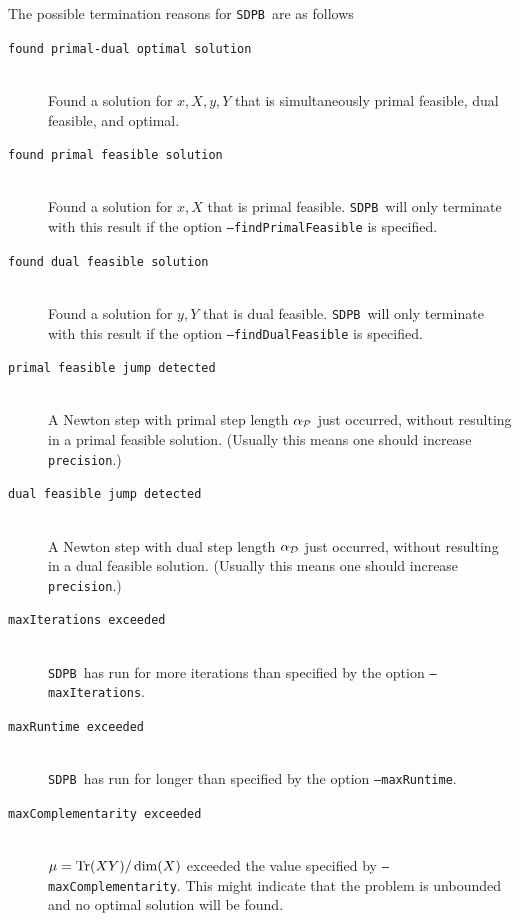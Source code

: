 \documentclass[12pt]{article}
\numberwithin{equation}{section}
\newcommand\SDPB{\texttt{SDPB}}
\begin{document}
The possible termination reasons for \SDPB\ are as follows
\begin{description}
\item[\texttt{found primal-dual optimal solution}] \hfill\\
Found a solution for $x,X,y,Y$ that is simultaneously primal feasible, dual feasible, and optimal.
\item[\texttt{found primal feasible solution}] \hfill\\
Found a solution for $x,X$ that is primal feasible.  \SDPB\ will only terminate with this result if the option \texttt{--findPrimalFeasible} is specified.
\item[\texttt{found dual feasible solution}] \hfill\\
Found a solution for $y,Y$ that is dual feasible.  \SDPB\ will only terminate with this result if the option \texttt{--findDualFeasible} is specified.
\item[\texttt{primal feasible jump detected}] \hfill\\
A Newton step with primal step length $\alpha_{\mathcal{P}}$ just occurred, without resulting in a primal feasible solution.  (Usually this means one should increase \texttt{precision}.)
\item[\texttt{dual feasible jump detected}] \hfill\\
A Newton step with dual step length $\alpha_{\mathcal{D}}$ just occurred, without resulting in a dual feasible solution.  (Usually this means one should increase \texttt{precision}.)
\item[\texttt{maxIterations exceeded}] \hfill\\
\SDPB\ has run for more iterations than specified by the option \texttt{--maxIterations}.
\item[\texttt{maxRuntime exceeded}] \hfill\\
\SDPB\ has run for longer than specified by the option \texttt{--maxRuntime}.
\item[\texttt{maxComplementarity exceeded}] \hfill\\
$\mu=\mathrm{Tr}(XY)/\dim(X)$ exceeded the value specified by \texttt{--maxComplementarity}.  This might indicate that the problem is unbounded and no optimal solution will be found.
\end{description}
\end{document}
